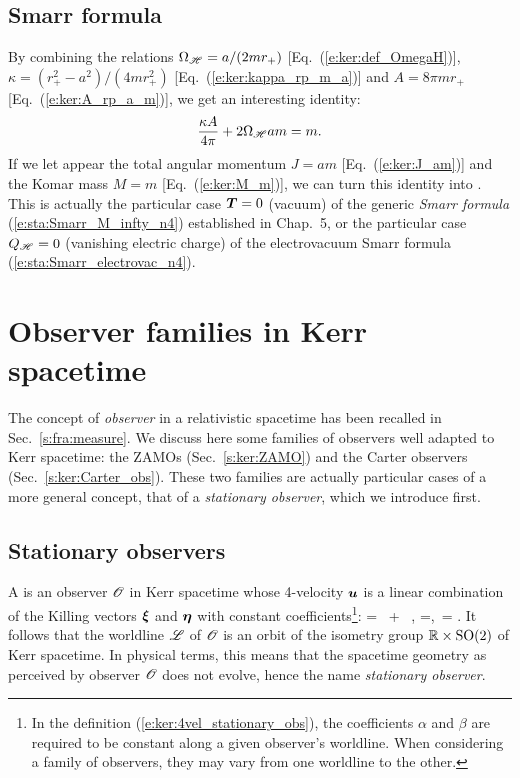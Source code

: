 \subsection{Smarr formula}

By combining the relations $\Omega_{\mathscr{H}} = a/(2 m r_+)$ [Eq.~(\ref{e:ker:def_OmegaH})],
$\kappa = (r_+^2 - a^2)/(4 m r_+^2)$ [Eq.~(\ref{e:ker:kappa_rp_m_a})]
and $A = 8\pi m r_+$ [Eq.~(\ref{e:ker:A_rp_a_m})], we get an interesting
identity:
\[
    \frac{\kappa A}{4\pi} + 2 \Omega_{\mathscr{H}} a m   = m .
\]
If we let appear the total angular momentum $J = a m$ [Eq.~(\ref{e:ker:J_am})]
and the Komar mass $M = m$ [Eq.~(\ref{e:ker:M_m})], we can turn this identity
into
\be \label{e:ker:Smarr}
     .
\ee
This is actually the particular case $\bm{T} = 0$ (vacuum) of the generic
\emph{Smarr formula} (\ref{e:sta:Smarr_M_infty_n4})
established in Chap.~5, or the particular
case $Q_{\mathscr{H}}=0$ (vanishing electric charge) of the electrovacuum Smarr formula
(\ref{e:sta:Smarr_electrovac_n4}).


\section{Observer families in Kerr spacetime} \label{s:ker:observers}

The concept of \emph{observer} in a relativistic spacetime
has been recalled in Sec.~\ref{s:fra:measure}.
We discuss here some families of observers well adapted to Kerr spacetime:
the ZAMOs (Sec.~\ref{s:ker:ZAMO}) and the Carter observers (Sec.~\ref{s:ker:Carter_obs}).
These two families are actually particular cases of a more general concept, that
of a \emph{stationary observer}, which we introduce first.

\subsection{Stationary observers} \label{s:ker:station_obs}

A 
is an observer $\mathscr{O}$ in Kerr spacetime whose 4-velocity $\bm{u}$ is a linear
combination of the Killing vectors $\bm{\xi}$ and $\bm{\eta}$ with constant coefficients\footnote{In
the definition (\ref{e:ker:4vel_stationary_obs}), the coefficients $\alpha$ and $\beta$
are required to be constant along a given observer's worldline. When considering a family of observers,
they may vary from one worldline to the other.}:
\be \label{e:ker:4vel_stationary_obs}
     = \alpha \, \w{\xi} + \beta \, \w{\eta} , \qquad \alpha=,\ \beta= .
\ee
It follows that the worldline $\mathscr{L}$ of $\mathscr{O}$ is an
orbit of the isometry group $\mathbb{R}\times\mathrm{SO}(2)$ of Kerr spacetime. In physical terms,
this means that the spacetime geometry as perceived by observer $\mathscr{O}$ does not evolve,
hence the name \emph{stationary observer}.

